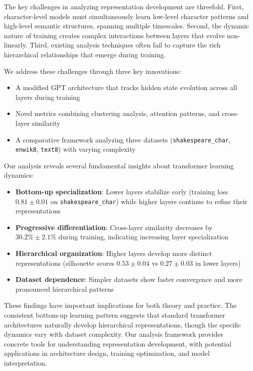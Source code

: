 \documentclass{article} %
\begin{document}
The key challenges in analyzing representation development are threefold. First, character-level models must simultaneously learn low-level character patterns and high-level semantic structures, spanning multiple timescales. Second, the dynamic nature of training creates complex interactions between layers that evolve non-linearly. Third, existing analysis techniques \citep{bahdanau2014neural} often fail to capture the rich hierarchical relationships that emerge during training.

We address these challenges through three key innovations:
\begin{itemize}
    \item A modified GPT architecture \citep{radford2019language} that tracks hidden state evolution across all layers during training
    \item Novel metrics combining clustering analysis, attention patterns, and cross-layer similarity
    \item A comparative framework analyzing three datasets (\texttt{shakespeare\_char}, \texttt{enwik8}, \texttt{text8}) with varying complexity
\end{itemize}

Our analysis reveals several fundamental insights about transformer learning dynamics:
\begin{itemize}
    \item \textbf{Bottom-up specialization}: Lower layers stabilize early (training loss $0.81 \pm 0.01$ on \texttt{shakespeare\_char}) while higher layers continue to refine their representations
    \item \textbf{Progressive differentiation}: Cross-layer similarity decreases by $30.2\% \pm 2.1\%$ during training, indicating increasing layer specialization
    \item \textbf{Hierarchical organization}: Higher layers develop more distinct representations (silhouette scores $0.53 \pm 0.04$ vs $0.27 \pm 0.03$ in lower layers)
    \item \textbf{Dataset dependence}: Simpler datasets show faster convergence and more pronounced hierarchical patterns
\end{itemize}

These findings have important implications for both theory and practice. The consistent bottom-up learning pattern suggests that standard transformer architectures naturally develop hierarchical representations, though the specific dynamics vary with dataset complexity. Our analysis framework provides concrete tools for understanding representation development, with potential applications in architecture design, training optimization, and model interpretation.
\end{document}
